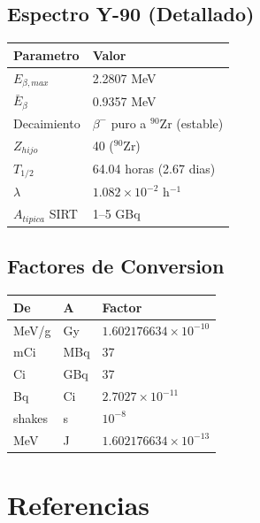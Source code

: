 \documentclass[12pt,a4paper]{article}
\begin{document}
\subsection{Espectro Y-90 (Detallado)}

\begin{center}
\begin{tabular}{ll}
\toprule
\textbf{Parametro} & \textbf{Valor} \\
\midrule
$E_{\beta,max}$ & 2.2807 MeV \\
$\bar{E}_\beta$ & 0.9357 MeV \\
Decaimiento & $\beta^-$ puro a $^{90}$Zr (estable) \\
$Z_{hijo}$ & 40 ($^{90}$Zr) \\
$T_{1/2}$ & 64.04 horas (2.67 dias) \\
$\lambda$ & $1.082 \times 10^{-2}$ h$^{-1}$ \\
$A_{tipica}$ SIRT & 1--5 GBq \\
\bottomrule
\end{tabular}
\end{center}

\subsection{Factores de Conversion}

\begin{center}
\begin{tabular}{lll}
\toprule
\textbf{De} & \textbf{A} & \textbf{Factor} \\
\midrule
MeV/g & Gy & $1.602176634 \times 10^{-10}$ \\
mCi & MBq & 37 \\
Ci & GBq & 37 \\
Bq & Ci & $2.7027 \times 10^{-11}$ \\
shakes & s & $10^{-8}$ \\
MeV & J & $1.602176634 \times 10^{-13}$ \\
\bottomrule
\end{tabular}
\end{center}

\newpage

\section*{Referencias}
\end{document}
